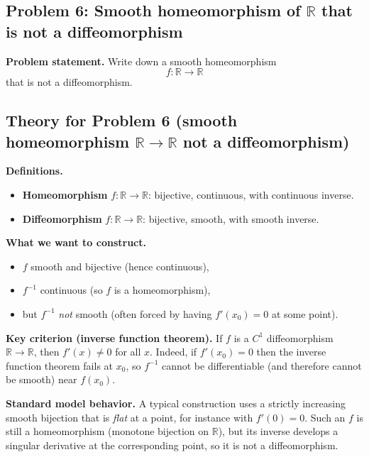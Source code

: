 \documentclass[12pt,a4paper]{article}
\theoremstyle{plain}
\theoremstyle{definition}      %
\begin{document}

\subsection*{Problem 6: Smooth homeomorphism of $\mathbb R$ that is not a diffeomorphism}

\noindent\textbf{Problem statement.}
Write down a smooth homeomorphism
\[
f:\mathbb R\longrightarrow \mathbb R
\]
that is not a diffeomorphism.


\subsection*{Theory for Problem 6 (smooth homeomorphism $\mathbb R\to\mathbb R$ not a diffeomorphism)}

\noindent\textbf{Definitions.}
\begin{itemize}
	\item \textbf{Homeomorphism} $f:\mathbb R\to\mathbb R$: bijective, continuous, with continuous inverse.
	\item \textbf{Diffeomorphism} $f:\mathbb R\to\mathbb R$: bijective, smooth, with smooth inverse.
\end{itemize}

\noindent\textbf{What we want to construct.}
\begin{itemize}
	\item $f$ smooth and bijective (hence continuous),
	\item $f^{-1}$ continuous (so $f$ is a homeomorphism),
	\item but $f^{-1}$ \emph{not} smooth (often forced by having $f'(x_0)=0$ at some point).
\end{itemize}

\noindent\textbf{Key criterion (inverse function theorem).}
If $f$ is a $C^1$ diffeomorphism $\mathbb R\to\mathbb R$, then $f'(x)\neq 0$ for all $x$.
Indeed, if $f'(x_0)=0$ then the inverse function theorem fails at $x_0$, so $f^{-1}$ cannot be differentiable
(and therefore cannot be smooth) near $f(x_0)$.

\noindent\textbf{Standard model behavior.}
A typical construction uses a strictly increasing smooth bijection that is \emph{flat} at a point,
for instance with $f'(0)=0$. Such an $f$ is still a homeomorphism (monotone bijection on $\mathbb R$),
but its inverse develops a singular derivative at the corresponding point, so it is not a diffeomorphism.
\end{document}
